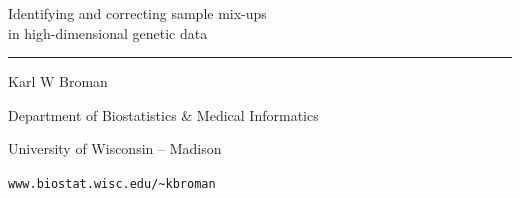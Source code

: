 \documentclass[12pt]{article}
\newcommand{\titlesize}{\fontsize{40}{50} \selectfont}
\newcommand{\headsize}{\fontsize{35}{35} \selectfont}
\newcommand{\textsize}{\fontsize{30}{35} \selectfont}
\newcommand{\smallersize}{\fontsize{20}{25} \selectfont}
\begin{document}
\thispagestyle{empty}

\begin{center}
\titlesize \color{myyellow}

\vspace*{10mm}

{\headsize Identifying and correcting sample mix-ups \\
in high-dimensional genetic data}

\color{mypink}
\rule{10in}{1mm}

\vspace{10mm}

\textsize \color{myblue}
Karl W Broman
\vspace{5mm}

{\smallersize Department of Biostatistics \& Medical Informatics

University of Wisconsin -- Madison
\vspace{20mm}


\verb|www.biostat.wisc.edu/~kbroman|
}

\end{center}


\newpage
\thispagestyle{empty}

\vspace*{-0.85in}
\end{document}
